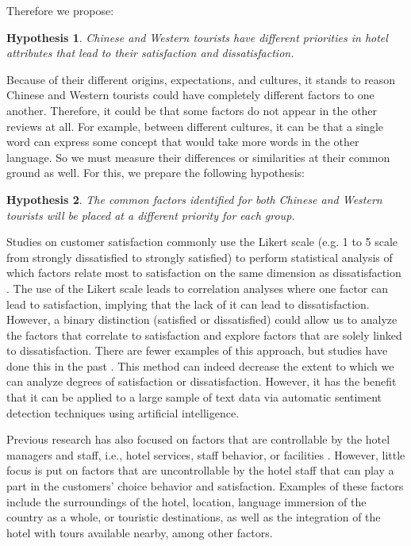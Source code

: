 \documentclass[smallextended,natbib]{svjour3}       %
\makeatletter
\newtheorem{hyp}{Hypothesis}
\newcounter{subhyp}
\newenvironment{subhyp}
 {%
  \setcounter{subhyp}{0}%
  \stepcounter{hyp}%
  \edef\saved@hyp{\thehyp}%
  \let\c@hyp\c@subhyp     %
  \renewcommand{\thehyp}{\saved@hyp\alph{hyp}}%
 }
 {}
\makeatother
\begin{document}
Therefore we propose:

\begin{subhyp}
\begin{hyp}
\label{hyp:diff_all}
Chinese and Western tourists have different priorities in hotel attributes that lead to their satisfaction and dissatisfaction.
\end{hyp}

Because of their different origins, expectations, and cultures, it stands to reason Chinese and Western tourists could have completely different factors to one another. Therefore, it could be that some factors do not appear in the other reviews at all. For example, between different cultures, it can be that a single word can express some concept that would take more words in the other language. So we must measure their differences or similarities at their common ground as well. For this, we prepare the following hypothesis:

\begin{hyp}
\label{hyp:diff_com}
The common factors identified for both Chinese and Western tourists will be placed at a different priority for each group.
\end{hyp}
\end{subhyp}

Studies on customer satisfaction \cite[e.g.][]{truong2009, romao2014, wu2009} commonly use the Likert scale \cite[][]{likert1932technique} (e.g. 1 to 5 scale from strongly dissatisfied to strongly satisfied) to perform statistical analysis of which factors relate most to satisfaction on the same dimension as dissatisfaction \cite[e.g.][]{chan201518, choi2000}. The use of the Likert scale leads to correlation analyses where one factor can lead to satisfaction, implying that the lack of it can lead to dissatisfaction. However, a binary distinction (satisfied or dissatisfied) could allow us to analyze the factors that correlate to satisfaction and explore factors that are solely linked to dissatisfaction. There are fewer examples of this approach, but studies have done this in the past \cite[e.g.][]{zhou2014}. This method can indeed decrease the extent to which we can analyze degrees of satisfaction or dissatisfaction. However, it has the benefit that it can be applied to a large sample of text data via automatic sentiment detection techniques using artificial intelligence. 

Previous research has also focused on factors that are controllable by the hotel managers and staff, i.e., hotel services, staff behavior, or facilities \cite[e.g.][]{shanka2004, choi2001}. However, little focus is put on factors that are uncontrollable by the hotel staff that can play a part in the customers' choice behavior and satisfaction. Examples of these factors include the surroundings of the hotel, location, language immersion of the country as a whole, or touristic destinations, as well as the integration of the hotel with tours available nearby, among other factors. 
\end{document}
